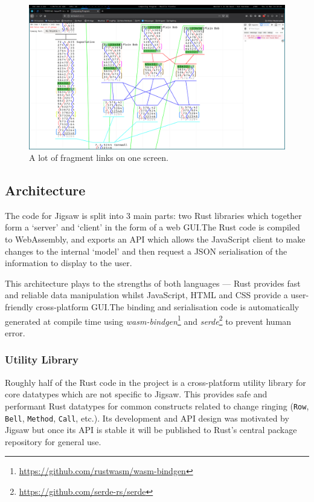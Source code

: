 \documentclass[12pt]{article}
\newcommand{\footurl}[1]{\footnote{\url{#1}}}
\begin{document}
\begin{figure}[h!]
    \centering
    \includegraphics[width=\textwidth]{linking-insane}
    \caption{A lot of fragment links on one screen.}\label{fig:linking-insane}
\end{figure}

\subsection{Architecture}

The code for Jigsaw is split into 3 main parts: two Rust libraries which together form a `server'
and `client' in the form of a web GUI.\@  The Rust code is compiled to WebAssembly, and exports an
API which allows the JavaScript client to make changes to the internal `model' and then request a
JSON serialisation of the information to display to the user.

This architecture plays to the strengths of both languages --- Rust provides fast and reliable data
manipulation whilst JavaScript, HTML and CSS provide a user-friendly cross-platform GUI.\@  The
binding and serialisation code is automatically generated at compile time using
\emph{wasm-bindgen}\footurl{https://github.com/rustwasm/wasm-bindgen} and
\emph{serde}\footurl{https://github.com/serde-rs/serde} to prevent human error.

\subsubsection{Utility Library}

Roughly half of the Rust code in the project is a cross-platform utility library for core datatypes
which are not specific to Jigsaw.  This provides safe and performant Rust datatypes for common
constructs related to change ringing (\verb|Row|, \verb|Bell|, \verb|Method|, \verb|Call|, etc.).
Its development and API design was motivated by Jigsaw but once its API is stable it will be
published to Rust's central package repository for general use.
\end{document}
